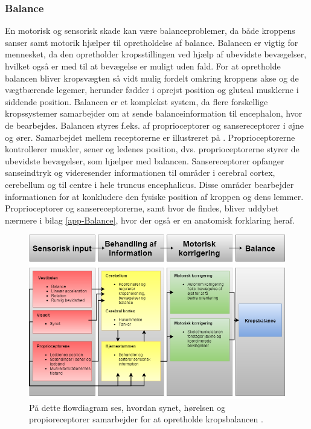 \subsubsection{Balance}
En motorisk og sensorisk skade kan være balanceproblemer, da både kroppens sanser samt motorik hjælper til opretholdelse af balance. Balancen er vigtig for mennesket, da den opretholder kropsstillingen ved hjælp af ubevidste bevægelser, hvilket også er med til at bevægelse er muligt uden fald. For at opretholde balancen bliver kropsvægten så vidt mulig fordelt omkring kroppens akse og de vægtbærende legemer, herunder fødder i oprejst position og gluteal musklerne i siddende position.\cite{Nichols1997}
Balancen er et komplekst system, da flere forskellige kropssystemer samarbejder om at sende balanceinformation til encephalon, hvor de bearbejdes. Balancen styres f.eks. af proprioceptorer og sansereceptorer i øjne og ører. Samarbejdet mellem receptorerne er illustreret på . Proprioceptorerne kontrollerer muskler, sener og ledenes position, dvs. proprioceptorerne styrer de ubevidste bevægelser, som hjælper med balancen. \cite{Martini2012} Sansereceptorer opfanger sanseindtryk og videresender informationen til områder i cerebral cortex, cerebellum og til centre i hele truncus encephalicus. Disse områder bearbejder informationen for at konkludere den fysiske position af kroppen og dens lemmer. \cite{Martini2012,Karnath2003} Proprioceptorer og sansereceptorerne, samt hvor de findes, bliver uddybet nærmere i bilag \ref{app-Balance}, hvor der også er en anatomisk forklaring heraf.

\begin{figure}[H]
	\centering
	\includegraphics[scale=0.48]{figures/bProblemanalyse/Balance-Flowdiagram.png}
	\caption{På dette flowdiagram ses, hvordan synet, hørelsen og propioreceptorer samarbejder for at opretholde kropsbalancen \cite{watson2015}.}
	\label{flowbalance}
\end{figure}

